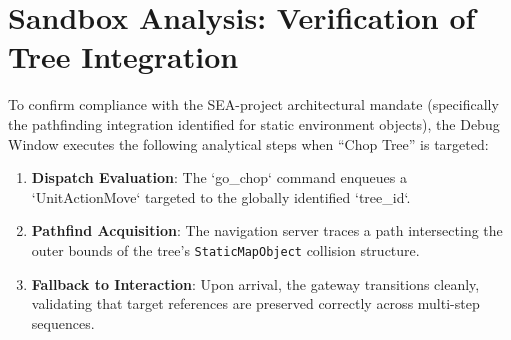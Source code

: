 \documentclass[11pt,a4paper]{article}
\begin{document}
\section{Sandbox Analysis: Verification of Tree Integration}

To confirm compliance with the SEA-project architectural mandate (specifically the pathfinding integration identified for static environment objects), the Debug Window executes the following analytical steps when ``Chop Tree'' is targeted:

\begin{enumerate}
    \item \textbf{Dispatch Evaluation}: The `go\_chop` command enqueues a `UnitActionMove` targeted to the globally identified `tree\_id`.
    \item \textbf{Pathfind Acquisition}: The navigation server traces a path intersecting the outer bounds of the tree's \texttt{StaticMapObject} collision structure.
    \item \textbf{Fallback to Interaction}: Upon arrival, the gateway transitions cleanly, validating that target references are preserved correctly across multi-step sequences.
\end{enumerate}
\end{document}
